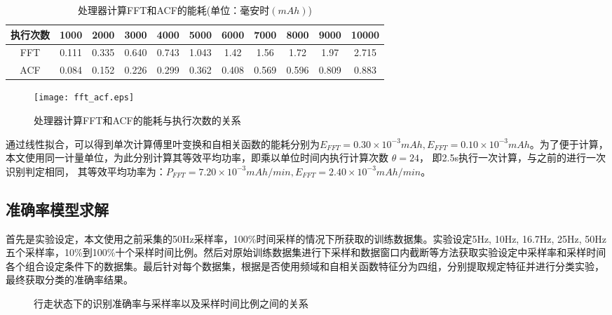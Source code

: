 \begin{table}[htb]
    \centering
    \caption{处理器计算FFT和ACF的能耗(单位：毫安时$(mAh)$)}\label{compute_energy}
    \begin{tabular}{ccccccccccc}
    \toprule
    执行次数 & 1000 & 2000 & 3000 & 4000 & 5000 & 6000 & 7000 & 8000 & 9000 & 10000 \\
    \midrule
    FFT & 0.111 & 0.335 & 0.640 & 0.743 & 1.043 & 1.42 & 1.56 & 1.72 & 1.97 & 2.715 \\
    ACF & 0.084 & 0.152 & 0.226 & 0.299 & 0.362 & 0.408 & 0.569 & 0.596 & 0.809 & 0.883 \\
    \bottomrule
    \end{tabular}
 \end{table}

\begin{figure}[htb]
\centering
\texttt{[image: fft\_acf.eps]}
\caption{处理器计算FFT和ACF的能耗与执行次数的关系}\label{fft_acf}
\end{figure}

通过线性拟合，可以得到单次计算傅里叶变换和自相关函数的能耗分别为$E_{FFT} = 0.30 \times 10^{-3} mAh, E_{FFT} = 0.10 \times 10^{-3} mAh$。为了便于计算，本文使用同一计量单位，为此分别计算其等效平均功率，即乘以单位时间内执行计算次数 $\theta = 24$， 即2.5s执行一次计算，与之前的进行一次识别判定相同， 其等效平均功率为：$P_{FFT} = 7.20 \times 10^{-3} mAh/min, E_{FFT} = 2.40 \times 10^{-3} mAh/min$。

\subsection{准确率模型求解}
\par 首先是实验设定，本文使用之前采集的50Hz采样率，100\%时间采样的情况下所获取的训练数据集。实验设定5Hz, 10Hz, 16.7Hz, 25Hz, 50Hz五个采样率，10\%到100\%十个采样时间比例。然后对原始训练数据集进行下采样和数据窗口内截断等方法获取实验设定中采样率和采样时间各个组合设定条件下的数据集。最后针对每个数据集，根据是否使用频域和自相关函数特征分为四组，分别提取规定特征并进行分类实验，最终获取分类的准确率结果。

\begin{figure}[!htb]
    \centering
    \caption{行走状态下的识别准确率与采样率以及采样时间比例之间的关系}\label{fit_precision}
\end{figure}

